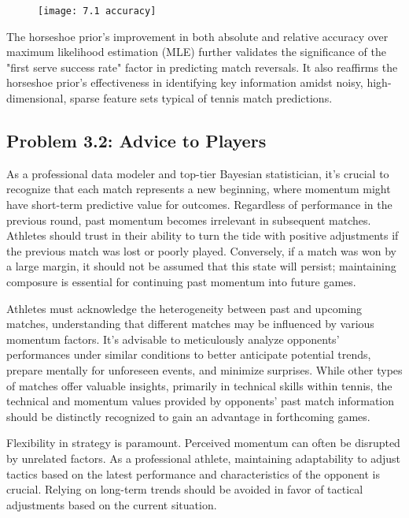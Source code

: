 \documentclass{mcmthesis}
\begin{document}
\begin{figure}[ht]%
  \small
  \centering
  \texttt{[image: 7.1 accuracy]}
\end{figure}

The horseshoe prior's improvement in both absolute and relative accuracy over maximum likelihood estimation (MLE) further validates the significance of the "first serve success rate" factor in predicting match reversals. It also reaffirms the horseshoe prior's effectiveness in identifying key information amidst noisy, high-dimensional, sparse feature sets typical of tennis match predictions.

\subsection{Problem 3.2: Advice to Players}

As a professional data modeler and top-tier Bayesian statistician, it's crucial to recognize that each match represents a new beginning, where momentum might have short-term predictive value for outcomes. Regardless of performance in the previous round, past momentum becomes irrelevant in subsequent matches. Athletes should trust in their ability to turn the tide with positive adjustments if the previous match was lost or poorly played. Conversely, if a match was won by a large margin, it should not be assumed that this state will persist; maintaining composure is essential for continuing past momentum into future games.

Athletes must acknowledge the heterogeneity between past and upcoming matches, understanding that different matches may be influenced by various momentum factors. It's advisable to meticulously analyze opponents' performances under similar conditions to better anticipate potential trends, prepare mentally for unforeseen events, and minimize surprises. While other types of matches offer valuable insights, primarily in technical skills within tennis, the technical and momentum values provided by opponents' past match information should be distinctly recognized to gain an advantage in forthcoming games.

Flexibility in strategy is paramount. Perceived momentum can often be disrupted by unrelated factors. As a professional athlete, maintaining adaptability to adjust tactics based on the latest performance and characteristics of the opponent is crucial. Relying on long-term trends should be avoided in favor of tactical adjustments based on the current situation.
\end{document}
